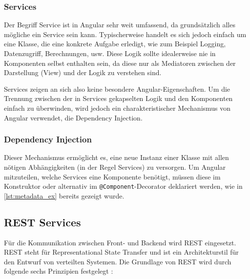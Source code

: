 \subsubsection{Services}
Der Begriff Service ist in Angular sehr weit umfassend, da grundsätzlich alles mögliche ein Service sein kann.
Typischerweise handelt es sich jedoch einfach um eine Klasse, die eine konkrete Aufgabe erledigt, wie zum Beispiel Logging, Datenzugriff, Berechnungen, usw.
Diese Logik sollte idealerweise nie in Komponenten selbst enthalten sein, da diese nur als Mediatoren zwischen der Darstellung (View) und der Logik zu verstehen sind.

Services zeigen an sich also keine besondere Angular-Eigenschaften. Um die Trennung zwischen der in Services gekapselten Logik und den Komponenten einfach zu überwinden, wird jedoch ein charakteristischer Mechanismus von Angular verwendet, die Dependency Injection.

\subsubsection{Dependency Injection}
Dieser Mechanismus ermöglicht es, eine neue Instanz einer Klasse mit allen nötigen Abhängigkeiten (in der Regel Services) zu versorgen.
Um Angular mitzuteilen, welche Services eine Komponente benötigt, müssen diese im Konstruktor oder alternativ im \texttt{@Component}-Decorator deklariert werden, wie in \cref{lst:metadata_ex} bereits gezeigt wurde.

\subsection{REST Services}
Für die Kommunikation zwischen Front- und Backend wird REST eingesetzt. REST steht für Representational State Transfer und ist ein Architekturstil für den Entwurf von verteilten Systemen. Die Grundlage von REST wird durch folgende sechs Prinzipien festgelegt \cite{Varanasi2015}:

